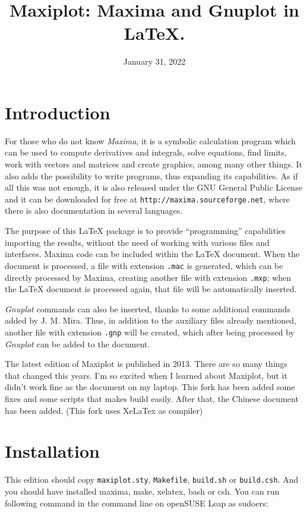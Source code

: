 \documentclass[11pt,a4paper]{article}
\title{Maxiplot: Maxima and Gnuplot in \LaTeX.\\}
\date{January 31, 2022}
\def\Maxima{\emph{Maxima}}
\def\Gnuplot{\emph{Gnuplot}}
\begin{document}
\maketitle

\section{Introduction}
For those who do not know \Maxima, it is a symbolic calculation
program which can be used to compute derivatives and integrals, solve
equations, find limits, work with vectors and matrices and create
graphics, among many other things. It also adds the possibility to
write programs, thus expanding its capabilities. As if all this was
not enough, it is also released under the GNU General Public License
and it can be downloaded for free at
\texttt{http://maxima.sourceforge.net}, where there is also
documentation in several languages.

The purpose of this \LaTeX{} package is to provide ``programming''
capabilities importing the results, without the need of working with
various files and interfaces. Maxima code can be included within the
\LaTeX{} document. When the document is processed, a file with
extension \texttt{.mac} is generated, which can be directly processed
by Maxima, creating another file with extension \texttt{.mxp}; when
the \LaTeX{} document is processed again, that file will be
automatically inserted.

\Gnuplot{} commands can also be inserted, thanks to some additional
commands added by J. M. Mira. Thus, in addition to the auxiliary files
already mentioned, another file with extension \texttt{.gnp} will be
created, which after being processed by \Gnuplot{} can be added to the
document.

The latest edition of Maxiplot is published in 2013. There are so many things that changed this years. I'm so excited when I learned about Maxiplot, but it didn't work fine as the document on my laptop. This fork has been added some fixes and some scripts that makes build easily. After that, the Chinese document has been added. (This fork uses XeLaTex as compiler)

\section{Installation}

This edition should copy \texttt{maxiplot.sty}, \texttt{Makefile}, \texttt{build.sh} or \texttt{build.csh}. And you should have installed maxima, make, xelatex, bash or csh. You can run following command in the command line on openSUSE Leap as sudoers:
\end{document}
